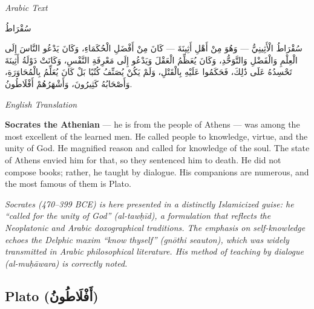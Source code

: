 \documentclass[11pt,a4paper]{article}
\def\RL#1{\beginR#1\endR}
\newcommand{\cnote}[1]{\textcolor{notecolor}{\textit{#1}}}
\newcommand{\textarabic}[1]{{\arabicfont\RL{#1}}}
\newenvironment{arabiccol}{%
  \begin{minipage}[t]{0.48\textwidth}%
  \begin{tcolorbox}[colback=leftbg,colframe=rulecolor,boxrule=0.4pt,arc=2pt,left=5pt,right=5pt,top=5pt,bottom=5pt]%
  \centering\textit{\footnotesize Arabic Text}\\[0.4em]%
  \raggedright\arabicfont\small%
}{%
  \end{tcolorbox}%
  \end{minipage}%
}
\newenvironment{englishcol}{%
  \begin{minipage}[t]{0.48\textwidth}%
  \begin{tcolorbox}[colback=rightbg,colframe=rulecolor,boxrule=0.4pt,arc=2pt,left=5pt,right=5pt,top=5pt,bottom=5pt]%
  \centering\textit{\footnotesize English Translation}\\[0.4em]%
  \raggedright\small%
}{%
  \end{tcolorbox}%
  \end{minipage}%
}
\begin{document}
\noindent
\begin{arabiccol}
\beginR
سُقْرَاطُ

سُقْرَاطُ الْأَثِينِيُّ — وَهُوَ مِنْ أَهْلِ أَثِينَةَ — كَانَ مِنْ أَفْضَلِ الْحُكَمَاءِ، وَكَانَ يَدْعُو النَّاسَ إِلَى الْعِلْمِ وَالْفَضْلِ وَالتَّوَحُّدِ، وَكَانَ يُعَظِّمُ الْعَقْلَ وَيَدْعُو إِلَى مَعْرِفَةِ النَّفْسِ، وَكَانَتْ دَوْلَةُ أَثِينَةَ تَحْسِدُهُ عَلَى ذَٰلِكَ، فَحَكَمُوا عَلَيْهِ بِالْقَتْلِ، وَلَمْ يَكُنْ يُصَنِّفُ كُتُبًا بَلْ كَانَ يُعَلِّمُ بِالْمُحَاوَرَةِ، وَأَصْحَابُهُ كَثِيرُونَ، وَأَشْهَرُهُمْ أَفْلَاطُونُ.
\endR
\end{arabiccol}
\hfill
\begin{englishcol}
\textbf{Socrates the Athenian} --- he is from the people of Athens --- was among the most excellent of the learned men. He called people to knowledge, virtue, and the unity of God. He magnified reason and called for knowledge of the soul. The state of Athens envied him for that, so they sentenced him to death. He did not compose books; rather, he taught by dialogue. His companions are numerous, and the most famous of them is Plato.

\cnote{Socrates (470--399 BCE) is here presented in a distinctly Islamicized guise: he ``called for the unity of God'' (\textit{al-tawḥīd}), a formulation that reflects the Neoplatonic and Arabic doxographical traditions. The emphasis on self-knowledge echoes the Delphic maxim ``know thyself'' (\textit{gnōthi seauton}), which was widely transmitted in Arabic philosophical literature. His method of teaching by dialogue (\textit{al-muḥāwara}) is correctly noted.}
\end{englishcol}

\par\vspace{0.5em}

\subsection{Plato (\textarabic{أَفْلَاطُونُ})}
\end{document}
